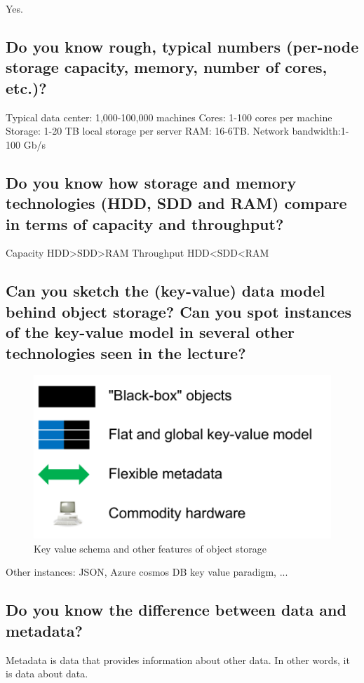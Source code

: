 \documentclass{article}
\begin{document}
Yes.

\subsection{Do you know rough, typical numbers (per-node storage capacity, memory, number of cores, etc.)?}

Typical data center: 1,000-100,000 machines
Cores: 1-100 cores per machine
Storage: 1-20 TB local storage per server
RAM: 16-6TB.
Network bandwidth:1-100 Gb/s

\subsection{Do you know how storage and memory technologies (HDD, SDD and RAM) compare in terms of capacity and throughput?}

Capacity HDD>SDD>RAM
Throughput HDD<SDD<RAM

\subsection{Can you sketch the (key-value) data model behind object storage? Can you spot instances of the key-value model in several other technologies seen in the lecture?}

\begin{figure}[H]
  \centering
  \includegraphics[width=.5\textwidth]{img/key_value_object_storage.png}
  \caption{Key value schema and other features of object storage}
  \label{fig:keyvalueobjectstorage}
\end{figure}

Other instances: JSON, Azure cosmos DB key value paradigm, ...



\subsection{Do you know the difference between data and metadata?}

Metadata is data that provides information about other data. In other words, it is data about data.
\end{document}
